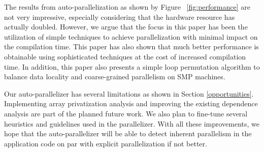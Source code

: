 The results from auto-parallelization as shown by Figure ~\ref{fig:performance} are not very impressive, especially considering that the hardware resource has actually doubled. However, we argue that the focus in this paper has been the utilization of simple techniques to achieve parallelization with minimal impact on the compilation time. This paper has also shown that much better performance is obtainable using sophisticated techniques at the cost of increased compilation time. In addition, this paper also presents a simple loop permutation algorithm to balance data
locality and coarse-grained parallelism on SMP machines.


Our auto-parallelizer has several limitations as shown in Section \ref{opportunities}. Implementing array privatization analysis and improving the existing dependence analysis are part of the planned future work. We also plan to fine-tune several heuristics and guidelines used in the parallelizer. With all these improvements, we hope that the auto-parallelizer will be able to detect inherent parallelism in the application code on par with explicit parallelization if not better.

